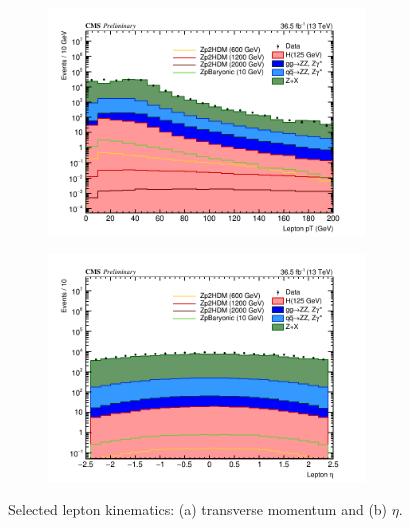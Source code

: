  
\begin{figure}[tbh]
\begin{subfigure}{0.50\textwidth}
\centering
\includegraphics[width=3.3in]{figures/hist_hPtLep_3.png}
\caption{}
\end{subfigure}
\begin{subfigure}{0.50\textwidth}
\centering
\includegraphics[width=3.3in]{figures/hist_hEtaLep_3.png}
\caption{}
\end{subfigure}
\caption{Selected lepton kinematics: (a) transverse momentum and (b) $\eta$.}
\label{fig:lepkin1}
\end{figure}
 
